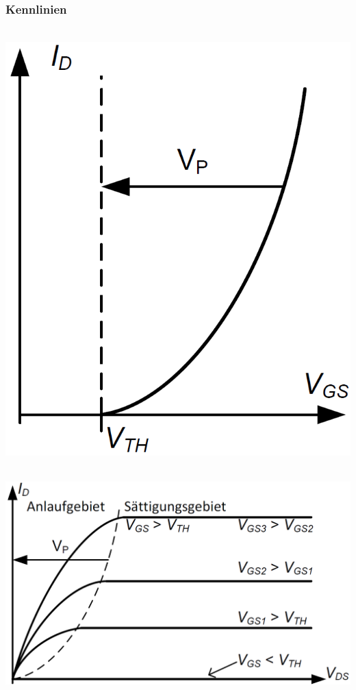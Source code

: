 \subsubsection{Kennlinien}

\begin{minipage}[t]{0.3\columnwidth}
    \centering{} \\
    \includegraphics[align=c, width=\columnwidth]{images/mos_fet_eingangskennlinie.png}
\end{minipage}
\hfill
\begin{minipage}[t]{0.6\columnwidth}
    \centering{} \\
    \includegraphics[align=c, width=\columnwidth]{images/mos_fet_ausgangskennlinien.png}
\end{minipage}


